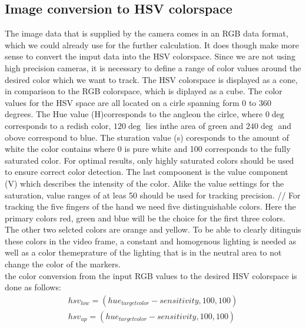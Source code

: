 \subsection{Image conversion to HSV colorspace}
The image data that is supplied by the camera comes in an RGB data format, which we could already use for the further calculation. It does though make more sense to convert the imput data into the HSV colorspace. Since we are not using high precision cameras, it is necessary to define a range of color values around the desired color which we want to track. The HSV colorspace is displayed as a cone, in comparison to the RGB colorspace, which is diplayed as a cube. The color values for the HSV space are all located on a cirle spanning form 0 to 360 degrees. The Hue value (H)corresponds to the angleon the cirlce, where $0\deg$ corresponds to a redish color, $120\deg$ lies inthe area of green and $240\deg$ and obove correspond to blue. The sturation value (s) coresponds to the amount of white the color contains  where 0 is pure white and 100 corresponds to the fully saturated color. For optimal results, only highly saturated colors should be used to ensure correct color detection. The last compoonent is the value component (V) which describes the intensity of the color. Alike the value settings for the saturation, value ranges of at leas 50 should be used for tracking precision.
//
For tracking the five fingers of the hand we need five distinguishable colors. Here the primary colors red, green and blue will be the choice for the first three colors. The other two selcted colors  are orange and yellow. To be able to clearly ditinguis these colors in the video frame, a constant and homogenous lighting is needed as well as a color themeprature of the lighting that is in the neutral area to not change the color of the markers.
\\the color conversion from the input RGB values to the desired HSV colorspace is done as follows:
\begin{equation}
\begin{split}
hsv_{low}=(hue_{targetcolor}-sensitivity,100,100)\\
hsv_{up}=(hue_{targetcolor}-sensitivity,100,100)\\
\end{split}
\end{equation}
